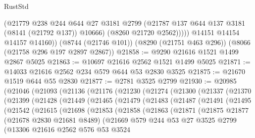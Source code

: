 \begin{lexlean}{RustStd}
\begin{coremodule}
              (@21779
                @238
                @244
                @644
                @27
                @3181
                @2799
                (@21787 @137 @644 @137 @3181 (@8141 (@21792 @137)) @10666)
                (@8260 @21720 @2562)))))
        @14151
        @14154
        @14157
        @14160))
    (@8744 (@21746 @101))
    (@8290 (@21751 @463 @296))
    (@8066 (@21758 @296 @197 @2897 @2867))
@21858 := @9290 @21616 @1521 @1499 @2867 @5025
@21863 := @10697 @21616 @2562 @1521 @1499 @5025
@21871 := @14033 @21616 @2562 @234 @579 @644 @53 @2830 @3525
@21875 := @21670 @1519 @644 @55 @2830
@21877 := @2781 @3525 @2799
@21930 := @20985
    (@21046
      (@21093
        (@21136
          (@21176
            (@21230
              (@21274
                (@21300
                  (@21337
                    (@21370
                      (@21399
                        (@21428
                          (@21449
                            (@21465
                              (@21479
                                (@21483
                                  (@21487
                                    (@21491
                                      (@21495
                                        (@21542
                                          (@21615
                                            (@21698
                                              (@21853
                                                (@21858
                                                  (@21863
                                                    (@21871
                                                      (@21875
                                                        @21877
                                                        (@21678 @2830 @21681 @8489)
                                                        (@21669
                                                          @579
                                                          @244
                                                          @53
                                                          @27
                                                          @3525
                                                          @2799
                                                          (@13306
                                                            @21616
                                                            @2562
                                                            @576
                                                            @53
                                                            @3524

\end{coremodule}
\end{lexlean}
